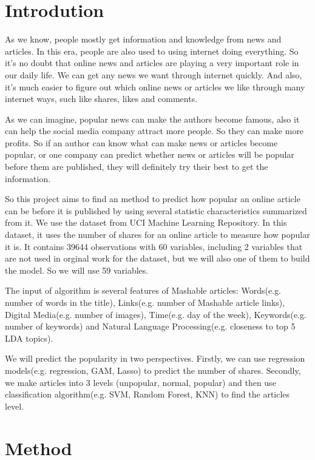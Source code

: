\documentclass[11pt]{article}
\begin{document}
\section{Introdution}
As we know, people mostly get information and knowledge from news and articles. In this era, people are also used to using internet doing everything. So it’s no doubt that online news and articles are playing a very important role in our daily life. We can get any news we want through internet quickly. And also, it’s much easier to figure out which online news or articles we like through many internet ways, such like shares, likes and comments. 

As we can imagine, popular news can make the authors become famous, also it can help the social media company attract more people. So they can make more profits. So if an author can know what can make news or articles become popular, or one company can predict whether news or articles will be popular before them are published, they will definitely try their best to get the information. 

So this project aims to find an method to predict how popular an online article can be before it is published by using several statistic characteristics summarized from it. We use the dataset from UCI Machine Learning Repository. In this dataset, it uses the number of shares for an online article to measure how popular it is. It contains 39644 observations with 60 variables, including 2 variables that are not used in orginal work for the dataset, but we will also one of them to build the model. So we will use 59 variables.

The input of algorithm is several features of Mashable articles: Words(e.g. number of words in the title), Links(e.g. number of Mashable article links), Digital Media(e.g. number of images), Time(e.g. day of the week), Keywords(e.g. number of keywords) and Natural Language Processing(e.g. closeness to top 5 LDA topics).

We will predict the popularity in two perspectives. Firstly, we can use regression models(e.g. regression, GAM, Lasso) to predict the number of shares. Secondly, we make articles into 3 levels (unpopular, normal, popular) and then use classification algorithm(e.g. SVM, Random Forest, KNN) to find the articles level.  

\section{Method}
\end{document}
